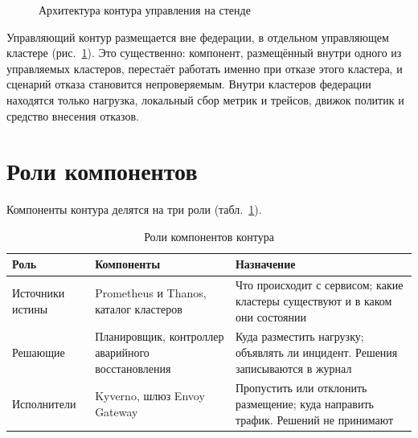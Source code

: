 \begin{figure}[ht]
  \caption{Архитектура контура управления на стенде}
  \label{fig:architecture}
\end{figure}

Управляющий контур размещается вне федерации, в отдельном управляющем
кластере (рис.~\ref{fig:architecture}). Это существенно: компонент,
размещённый внутри одного из управляемых кластеров, перестаёт работать
именно при отказе этого кластера, и сценарий отказа становится
непроверяемым. Внутри кластеров федерации находятся только нагрузка,
локальный сбор метрик и трейсов, движок политик и средство внесения
отказов.

\section{Роли компонентов}

Компоненты контура делятся на три роли (табл.~\ref{tab:roles}).

\begin{table}[ht]
  \centering
  \caption{Роли компонентов контура}
  \label{tab:roles}
  \small
  \begin{tabularx}{\textwidth}{@{}lXX@{}}
    \toprule
    Роль & Компоненты & Назначение \\
    \midrule
    Источники истины & Prometheus и Thanos, каталог кластеров &
      Что происходит с сервисом; какие кластеры существуют и в каком они
      состоянии \\
    Решающие & Планировщик, контроллер аварийного восстановления &
      Куда разместить нагрузку; объявлять ли инцидент. Решения
      записываются в журнал \\
    Исполнители & Kyverno, шлюз Envoy Gateway &
      Пропустить или отклонить размещение; куда направить трафик. Решений
      не принимают \\
    \bottomrule
  \end{tabularx}
\end{table}

